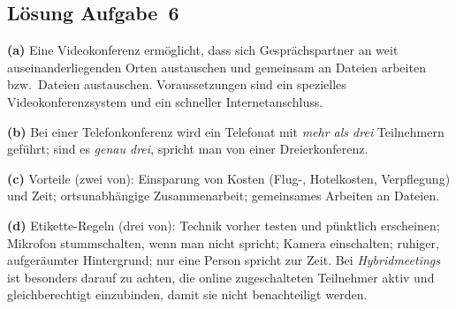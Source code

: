 \documentclass[11pt, a4paper]{article}
\begin{document}
\subsection*{Lösung Aufgabe~6}
\begin{loesung}
\textbf{(a)} Eine Videokonferenz ermöglicht, dass sich Gesprächspartner an weit
auseinanderliegenden Orten austauschen und gemeinsam an Dateien arbeiten bzw.\ Dateien
austauschen. Voraussetzungen sind ein spezielles Videokonferenzsystem und ein schneller
Internetanschluss.

\textbf{(b)} Bei einer Telefonkonferenz wird ein Telefonat mit \emph{mehr als drei}
Teilnehmern geführt; sind es \emph{genau drei}, spricht man von einer Dreierkonferenz.

\textbf{(c)} Vorteile (zwei von): Einsparung von Kosten (Flug-, Hotelkosten, Verpflegung)
und Zeit; ortsunabhängige Zusammenarbeit; gemeinsames Arbeiten an Dateien.

\textbf{(d)} Etikette-Regeln (drei von): Technik vorher testen und pünktlich erscheinen;
Mikrofon stummschalten, wenn man nicht spricht; Kamera einschalten; ruhiger, aufgeräumter
Hintergrund; nur eine Person spricht zur Zeit. Bei \emph{Hybridmeetings} ist besonders darauf
zu achten, die online zugeschalteten Teilnehmer aktiv und gleichberechtigt einzubinden, damit
sie nicht benachteiligt werden.
\end{loesung}
\end{document}
